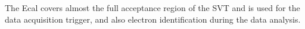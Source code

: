 \documentclass[b1]{sciposter}
\begin{document}
\begin{multicols}{3}
The Ecal covers almost the full acceptance region of the SVT and is used for the data acquisition trigger, and also electron identification during the data analysis. \cite{Balossino:2016nly}
	







\end{multicols}
\end{document}
